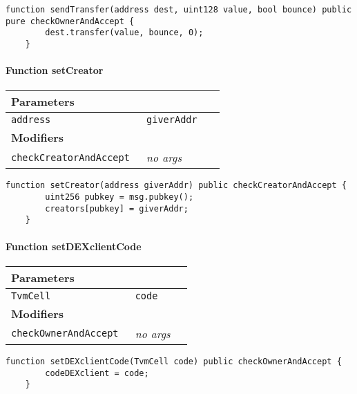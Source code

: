 \vspace{2cm}

\begin{lstlisting}[firstnumber=71]
	function sendTransfer(address dest, uint128 value, bool bounce) public pure checkOwnerAndAccept {
		dest.transfer(value, bounce, 0);
	}
\end{lstlisting}

\paragraph{Function setCreator}


\ifsoltables
\noindent\begin{tabular}{|l|l|p{5cm}|}\hline
\multicolumn{3}{|l|}{\bf Parameters}\\\hline
\tt address & \tt giverAddr &\\\hline
\multicolumn{3}{|l|}{\bf Modifiers}\\\hline
\tt checkCreatorAndAccept & {\em no args} &\\\hline
\end{tabular}
\fi

\vspace{2cm}

\begin{lstlisting}[firstnumber=100]
	function setCreator(address giverAddr) public checkCreatorAndAccept {
		uint256 pubkey = msg.pubkey();
		creators[pubkey] = giverAddr;
	}
\end{lstlisting}

\paragraph{Function setDEXclientCode}


\ifsoltables
\noindent\begin{tabular}{|l|l|p{5cm}|}\hline
\multicolumn{3}{|l|}{\bf Parameters}\\\hline
\tt TvmCell & \tt code &\\\hline
\multicolumn{3}{|l|}{\bf Modifiers}\\\hline
\tt checkOwnerAndAccept & {\em no args} &\\\hline
\end{tabular}
\fi

\vspace{2cm}

\begin{lstlisting}[firstnumber=80]
	function setDEXclientCode(TvmCell code) public checkOwnerAndAccept {
		codeDEXclient = code;
	}
\end{lstlisting}

